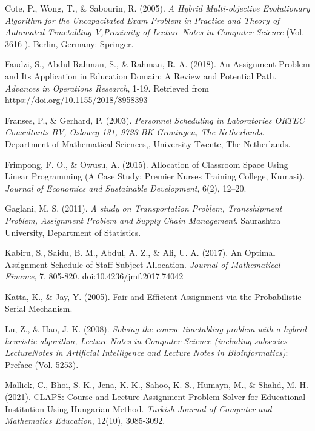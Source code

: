 \documentclass[11pt]{report}
\begin{document}
\begin{description}
		\item Cote, P., Wong, T., \& Sabourin, R. (2005). \emph{A Hybrid Multi-objective Evolutionary Algorithm for the Uncapacitated Exam Problem in Practice and Theory of Automated Timetabling V,Proximity of Lecture Notes in Computer Science} (Vol. 3616 ). Berlin, Germany: Springer.
		
		\item Faudzi, S., Abdul-Rahman, S., \& Rahman, R. A. (2018). An Assignment Problem and Its
		Application in Education Domain: A Review and Potential Path. \emph{Advances in Operations
		Research}, 1-19. Retrieved from https://doi.org/10.1155/2018/8958393
		
		\item Franses, P., \& Gerhard, P. (2003). \emph{Personnel Scheduling in Laboratories ORTEC Consultants BV,	Osloweg 131, 9723 BK Groningen, The Netherlands}. Department of Mathematical
		Sciences,, University Twente, The Netherlands.
		
		\item Frimpong, F. O., \& Owusu, A. (2015). Allocation of Classroom Space Using Linear Programming
		(A Case Study: Premier Nurses Training College, Kumasi). \emph{Journal of Economics and
		Sustainable Development}, 6(2), 12–20.
	
		\item Gaglani, M. S. (2011). \emph{A study on Transportation Problem, Transshipment Problem, Assignment Problem and Supply Chain Management}. Saurashtra University, Department of Statistics.
		
		\item Kabiru, S., Saidu, B. M., Abdul, A. Z., \& Ali, U. A. (2017). An Optimal Assignment Schedule of
		Staff-Subject Allocation. \emph{Journal of Mathematical Finance}, 7, 805-820.
		doi:10.4236/jmf.2017.74042
		
		\item Katta, K., \& Jay, Y. (2005). Fair and Efficient Assignment via the Probabilistic Serial Mechanism.
		
		\item Lu, Z., \& Hao, J. K. (2008). \emph{Solving the course timetabling problem with a hybrid heuristic
		algorithm, Lecture Notes in Computer Science (including subseries LectureNotes in
		Artificial Intelligence and Lecture Notes in Bioinformatics)}: Preface (Vol. 5253).
		
		Mallick, C., Bhoi, S. K., Jena, K. K., Sahoo, K. S., Humayn, M., \& Shahd, M. H. (2021). CLAPS:
		Course and Lecture Assignment Problem Solver for Educational Institution Using Hungarian Method. \emph{Turkish Journal of Computer and Mathematics Education}, 12(10), 3085-3092.
		

\end{description}
\end{document}

